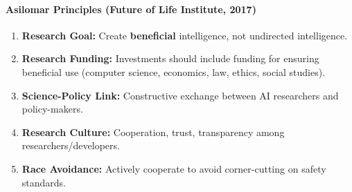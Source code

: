 \separator

\paragraph*{Asilomar Principles (Future of Life Institute, 2017)}

\begin{keybox}
\begin{enumerate}
  \item \textbf{Research Goal:} Create \textbf{beneficial} intelligence, not undirected intelligence.
  \item \textbf{Research Funding:} Investments should include funding for ensuring beneficial use (computer science, economics, law, ethics, social studies).
  \item \textbf{Science-Policy Link:} Constructive exchange between AI researchers and policy-makers.
  \item \textbf{Research Culture:} Cooperation, trust, transparency among researchers/developers.
  \item \textbf{Race Avoidance:} Actively cooperate to avoid corner-cutting on safety standards.
\end{enumerate}
\end{keybox}

